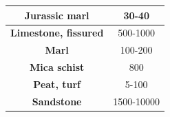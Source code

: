 \documentclass[12pt,fleqn]{book} %
\begin{document}
\begin{enumerate}
\begin{table}[!h]
\begin{tabular}{!{\color[rgb]{0.557,0.667,0.859}\vrule}c!{\color{black}\vrule}c!{\color[rgb]{0.557,0.667,0.859}\vrule}}
\hline
{} \textbf{\textcolor[rgb]{0.322,0,0}{Jurassic} marl\textcolor[rgb]{0.322,0,0}{}}              & 30-40                                                                                                                                                                                                                                                                                                                  \\ 
\hline
\textbf{Limestone,\textcolor[rgb]{0.322,0,0}{ fissured}}                                                                      & 500-1000                                                                                                                                                                                                                                                                                                               \\ 
\hline
{} \textcolor[rgb]{0.322,0,0}{\textbf{Marl}}                                                   & 100-200                                                                                                                                                                                                                                                                                                                \\ 
\hline
\textbf{Mica schist}                                                                                                          & 800                                                                                                                                                                                                                                                                                                                    \\ 
\hline
{} \textbf{Peat, turf}                                                                         & 5-100                                                                                                                                                                                                                                                                                                                  \\ 
\hline
\textbf{Sandstone}                                                                                                            & 1500-10000                                                                                                                                                                                                                                                                                                             \\ 

\end{tabular}
\end{table}
\end{enumerate}
\end{document}
